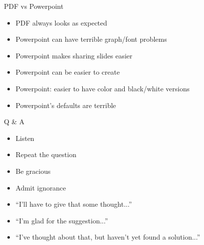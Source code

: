 \documentclass[12pt]{article}
\newcommand{\headsize}{\fontsize{35}{35} \selectfont}
\newcommand{\smallsize}{\fontsize{25}{30} \selectfont}
\begin{document}
\newpage

\headsize \color{myyellow}
\hfill \begin{minipage}{5.75in}
\centering
PDF vs Powerpoint
\end{minipage}

\vspace{3cm} \color{mywhite} \smallsize

\hfill \begin{minipage}{9.5in}

\begin{itemize}
\itemsep18pt
\item PDF always looks as expected

\item Powerpoint can have terrible graph/font problems

\item Powerpoint makes sharing slides easier

\item Powerpoint can be easier to create

\item Powerpoint: easier to have color and black/white versions

\item Powerpoint's defaults are terrible

\end{itemize}

\end{minipage}




\newpage

\headsize \color{myyellow}
\hfill \begin{minipage}{5.75in}
\centering
Q \& A
\end{minipage}

\vspace{3cm} \color{mywhite} \smallsize

\hfill \begin{minipage}{9.5in}

\begin{itemize}
\itemsep18pt
\item Listen

\item Repeat the question 

\item Be gracious

\item Admit ignorance

\item ``I'll have to give that some thought...''

\item ``I'm glad for the suggestion...''

\item ``I've thought about that, but haven't yet found a solution...''

\end{itemize}

\end{minipage}
\end{document}
